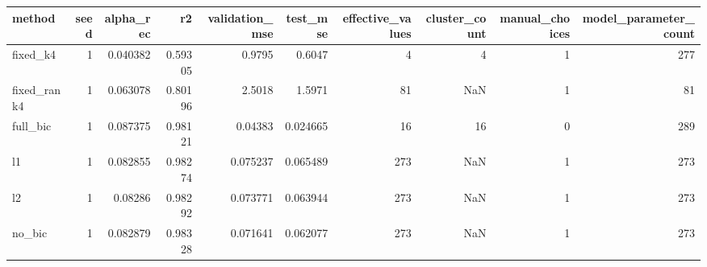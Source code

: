 \begin{tabular}{lrrrrrrrrr}
\toprule
method & seed & alpha\_rec & r2 & validation\_mse & test\_mse & effective\_values & cluster\_count & manual\_choices & model\_parameter\_count \\
\midrule
fixed\_k4 & 1 & 0.040382 & 0.59305 & 0.9795 & 0.6047 & 4 & 4 & 1 & 277 \\
fixed\_rank4 & 1 & 0.063078 & 0.80196 & 2.5018 & 1.5971 & 81 & NaN & 1 & 81 \\
full\_bic & 1 & 0.087375 & 0.98121 & 0.04383 & 0.024665 & 16 & 16 & 0 & 289 \\
l1 & 1 & 0.082855 & 0.98274 & 0.075237 & 0.065489 & 273 & NaN & 1 & 273 \\
l2 & 1 & 0.08286 & 0.98292 & 0.073771 & 0.063944 & 273 & NaN & 1 & 273 \\
no\_bic & 1 & 0.082879 & 0.98328 & 0.071641 & 0.062077 & 273 & NaN & 1 & 273 \\
\bottomrule
\end{tabular}
